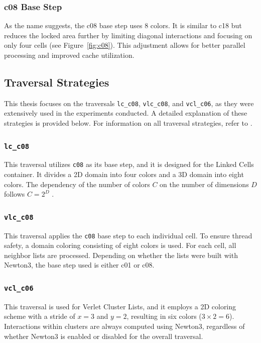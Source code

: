 \subsubsection{c08 Base Step} As the name suggests, the c08 base step uses 8 colors. It is similar to c18 but reduces the locked area further by limiting diagonal interactions and focusing on only four cells (see Figure~\ref{fig:c08}). This adjustment allows for better parallel processing and improved cache utilization.


\subsection{Traversal Strategies}
This thesis focuses on the traversals \texttt{lc\_c08}, \texttt{vlc\_c08}, and \texttt{vcl\_c06}, as they were extensively used in the experiments conducted. A detailed explanation of these strategies is provided below. For information on all traversal strategies, refer to \parencite{gratl2022n}.

\subsubsection{\texttt{lc\_c08}}
This traversal utilizes \texttt{c08} as its base step, and it is designed for the Linked Cells container. It divides a 2D domain into four colors and a 3D domain into eight colors. The dependency of the number of colors \(C\) on the number of dimensions \(D\) follows \(C = 2^D\) \parencite{gratl2022n}.

\subsubsection{\texttt{vlc\_c08}}
This traversal applies the \texttt{c08} base step to each individual cell. To ensure thread safety, a domain coloring consisting of eight colors is used. For each cell, all neighbor lists are processed. Depending on whether the lists were built with Newton3, the base step used is either c01 or c08. \parencite{AutoPasDocs}

\subsubsection{\texttt{vcl\_c06}}
This traversal is used for Verlet Cluster Lists, and it employs a 2D coloring scheme with a stride of \(x = 3\) and \(y = 2\), resulting in six colors (\(3 \times 2 = 6\)). Interactions within clusters are always computed using Newton3, regardless of whether Newton3 is enabled or disabled for the overall traversal. \parencite{AutoPasDocs}

